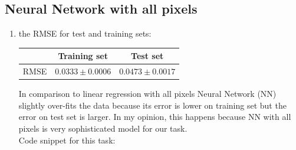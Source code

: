 \documentclass{article}
\begin{document}
		\subsection{Neural Network with all pixels}
			\begin{enumerate}[label=(\alph*)]
				\item
					the RMSE for test and training sets:
					\begin{center}
						\begin{tabular}{| c | c | c |}
							\hline
							\, & Training set & Test set \\ \hline
							RMSE  & $0.0333 \pm 0.0006$ & $0.0473 \pm 0.0017$ \\ 
							\hline
						\end{tabular}
					\end{center}
					In comparison to linear regression with all pixels Neural Network (NN) slightly over-fits the data because  its error is lower on training set but the error on test set is larger. In my opinion, this happens because NN with all pixels is very sophisticated model for our task.\\
					Code snippet for this task:
					
					

\end{enumerate}
\end{document}
